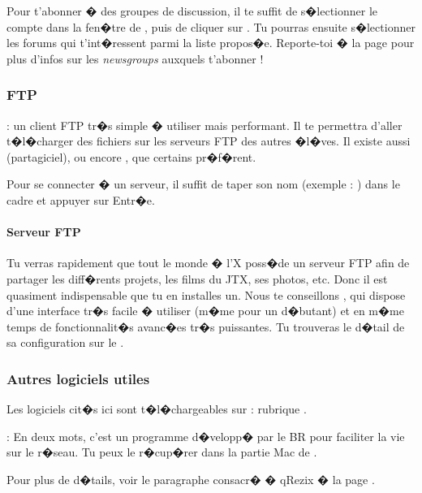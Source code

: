Pour t'abonner � des groupes de discussion, il te suffit de s�lectionner le compte  dans la fen�tre  de
, puis de cliquer sur . Tu pourras ensuite s�lectionner les forums qui
t'int�ressent parmi la liste propos�e. Reporte-toi � la page \pageref{newsgroups} pour plus d'infos sur les \emph{newsgroups} auxquels t'abonner !

\subsubsection{FTP}

  : un
client FTP tr�s simple � utiliser mais performant. Il te permettra
d'aller t�l�charger des fichiers sur les serveurs FTP des autres
�l�ves. Il existe aussi  (partagiciel), ou encore , que certains pr�f�rent.

Pour se connecter � un serveur, il suffit de taper son nom (exemple : ) dans le cadre  et appuyer sur Entr�e.\\

\paragraph{Serveur FTP} Tu verras rapidement que tout le monde � l'X poss�de un serveur FTP
afin de partager les diff�rents projets, les films du JTX, ses
photos, etc. Donc il est quasiment indispensable que tu en installes
un. Nous te conseillons , qui dispose d'une interface tr�s facile � utiliser (m�me pour un d�butant) et en m�me temps de fonctionnalit�s avanc�es tr�s puissantes. Tu trouveras le d�tail de sa configuration sur le .

\subsubsection{Autres logiciels utiles}

Les logiciels cit�s ici sont t�l�chargeables sur  :
rubrique .

 \noindent{} : En
deux mots, c'est un programme d�velopp� par le BR pour faciliter la
vie sur le r�seau. Tu peux le r�cup�rer dans la partie Mac de
\xshare.

\noindent Pour plus de d�tails, voir le paragraphe consacr� � qRezix
� la page \pageref{qrezix}.


